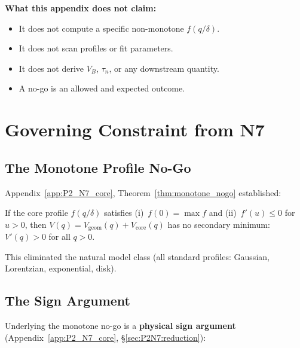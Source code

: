 \textbf{What this appendix does not claim:}
\begin{itemize}
    \item It does not compute a specific non-monotone $f(q/\delta)$.
    \item It does not scan profiles or fit parameters.
    \item It does not derive $V_B$, $\tau_n$, or any downstream quantity.
    \item A no-go is an allowed and expected outcome.
\end{itemize}

\section{Governing Constraint from N7}
\label{sec:NMCP:constraint}

\subsection{The Monotone Profile No-Go}

Appendix~\ref{app:P2_N7_core}, Theorem~\ref{thm:monotone_nogo}
established:

\begin{resultbox}[title=N7 Monotone Profile No-Go (restated)]
If the core profile $f(q/\delta)$ satisfies
(i)~$f(0) = \max f$ and (ii)~$f'(u) \leq 0$ for $u > 0$,
then $V(q) = V_{\mathrm{geom}}(q) + V_{\mathrm{core}}(q)$
has no secondary minimum: $V'(q) > 0$ for all $q > 0$.
\tagDc
\end{resultbox}

This eliminated the natural model class (all standard profiles:
Gaussian, Lorentzian, exponential, disk).

\subsection{The Sign Argument}

Underlying the monotone no-go is a \textbf{physical sign argument}
(Appendix~\ref{app:P2_N7_core}, \S\ref{sec:P2N7:reduction}):

